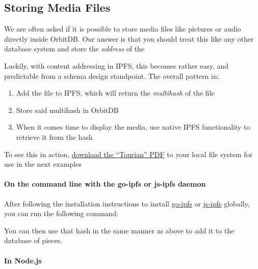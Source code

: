 \hypertarget{storing-media-files}{\subsection{Storing Media
Files}\label{storing-media-files}}

We are often asked if it is possible to store media files like pictures
or audio directly inside OrbitDB. Our answer is that you should treat
this like any other database system and store the \emph{address} of the

Luckily, with content addressing in IPFS, this becomes rather easy, and
predictable from a schema design standpoint. The overall pattern in:

\begin{enumerate}
\def\labelenumi{\arabic{enumi}.}
\tightlist
\item
  Add the file to IPFS, which will return the \emph{multihash} of the
  file
\item
  Store said multihash in OrbitDB
\item
  When it comes time to display the media, use native IPFS functionality
  to retrieve it from the hash
\end{enumerate}

To see this in action,
\href{https://ipfs.io/ipfs/QmYPpj6XVNPPYgwvN4iVaxZLHy982TPkSAxBf2rzGHDach}{download
the ``Tourian'' PDF} to your local file system for use in the next
examples

\paragraph{On the command line with the go-ipfs or js-ipfs
daemon}\label{on-the-command-line-with-the-go-ipfs-or-js-ipfs-daemon}

After following the installation instructions to install
\href{}{go-ipfs} or \href{}{js-ipfs} globally, you can run the following
command:

\begin{Shaded}
\begin{Highlighting}[]
\NormalTok{$ }
\end{Highlighting}
\end{Shaded}

You can then use that hash in the same manner as above to add it to the
database of pieces.

\paragraph{In Node.js}\label{in-node.js-1}

